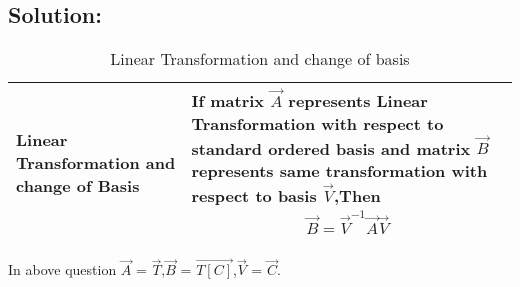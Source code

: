 \documentclass[journal,12pt,twocolumn]{IEEEtran}
\begin{document}
\subsection*{\textbf{Solution:}}
\begin{table}[h!]
\begin{center}
\begin{tabular}{|m{2cm}|m{6cm}|}\hline
        Linear Transformation and change of Basis & If matrix $\vec{A}$ represents Linear Transformation with respect to standard ordered basis and matrix $\vec{B}$ represents same transformation with respect to basis $\vec{V}$,Then{\begin{align*}
            \vec{B} = \vec{V}^{-1}\vec{A}\vec{V}
        \end{align*}}\\
        \hline
\end{tabular}
\end{center}
\caption{Linear Transformation and change of basis}
\label{tab:my_label}
\end{table}
In above question $\vec{A}$ = $\vec{T}$,$\vec{B}$ = $\vec{T[C]}$,$\vec{V}$ = $\vec{C}$.
\end{document}

